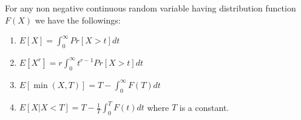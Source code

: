 \documentclass[12pt]{article}
\begin{document}
For any non negative continuous random variable having distribution function $F(X)$ we have the followings:
\begin{enumerate}
 \item $E[X]=\int_{0}^{\infty}Pr[X>t]dt$
 \item $E[X^r]=r\int_{0}^{\infty}t^{r-1}Pr[X>t]dt$
 \item $E[\min(X,T)]=T-\int_{0}^{\infty} F(T)dt$
 \item $E[X|X<T]=T-\frac{1}{T}\int_{0}^{T}F(t)dt$   
 where $T$ is a constant.
\end{enumerate}
\end{document}
